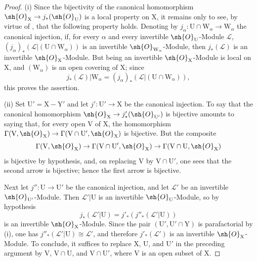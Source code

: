 \begin{proof}
(i) Since the bijectivity of the canonical homomorphism $\sh{O}_{\mathrm{X}}\to j_*(\sh{O}_{\mathrm{U}})$ is a local property on $\mathrm{X}$, it remains only to see, by virtue of , that the following property holds. Denoting by $j_\alpha:\mathrm{U}\cap\mathrm{W}_\alpha\to\mathrm{W}_\alpha$ the canonical injection, if, for every $\alpha$ and every invertible $\sh{O}_{\mathrm{U}}$-Module $\mathscr{L}$, $(j_\alpha)_*(\mathscr{L}|(\mathrm{U}\cap\mathrm{W}_\alpha))$ is an invertible $\sh{O}_{\mathrm{W}_\alpha}$-Module, then $j_*(\mathscr{L})$ is an invertible $\sh{O}_{\mathrm{X}}$-Module.
But being an invertible $\sh{O}_{\mathrm{X}}$-Module is local on $\mathrm{X}$, and $(\mathrm{W}_\alpha)$ is an open covering of $\mathrm{X}$; since
\[
  j_*(\mathscr{L})|\mathrm{W}_\alpha=(j_\alpha)_*(\mathscr{L}|(\mathrm{U}\cap\mathrm{W}_\alpha)),
\]
this proves the assertion.

(ii) Set $\mathrm{U}'=\mathrm{X}-\mathrm{Y}'$ and let $j':\mathrm{U}'\to\mathrm{X}$ be the canonical injection.
To say that the canonical homomorphism $\sh{O}_{\mathrm{X}}\to j'_*(\sh{O}_{\mathrm{U}'})$ is bijective amounts to saying that, for every open $\mathrm{V}$ of $\mathrm{X}$, the homomorphism $\Gamma(\mathrm{V},\sh{O}_{\mathrm{X}})\to\Gamma(\mathrm{V}\cap\mathrm{U}',\sh{O}_{\mathrm{X}})$ is bijective. But the composite
\[
  \Gamma(\mathrm{V},\sh{O}_{\mathrm{X}})\to\Gamma(\mathrm{V}\cap\mathrm{U}',\sh{O}_{\mathrm{X}})\to\Gamma(\mathrm{V}\cap\mathrm{U},\sh{O}_{\mathrm{X}})
\]
is bijective by hypothesis, and, on replacing $\mathrm{V}$ by $\mathrm{V}\cap\mathrm{U}'$, one sees that the second arrow is bijective; hence the first arrow is bijective.

Next let $j'':\mathrm{U}\to\mathrm{U}'$ be the canonical injection, and let $\mathscr{L}'$ be an invertible $\sh{O}_{\mathrm{U}'}$-Module. Then $\mathscr{L}'|\mathrm{U}$ is an invertible $\sh{O}_{\mathrm{U}}$-Module, so by hypothesis
\[
  j_*(\mathscr{L}'|\mathrm{U})=j'_*(j''_*(\mathscr{L}'|\mathrm{U}))
\]
is an invertible $\sh{O}_{\mathrm{X}}$-Module. Since the pair $(\mathrm{U}',\mathrm{U}'\cap\mathrm{Y})$ is parafactorial by (i), one has $j''_*(\mathscr{L}'|\mathrm{U})\cong\mathscr{L}'$, and therefore $j'_*(\mathscr{L}')$ is an invertible $\sh{O}_{\mathrm{X}}$-Module. To conclude, it suffices to replace $\mathrm{X}$, $\mathrm{U}$, and $\mathrm{U}'$ in the preceding argument by $\mathrm{V}$, $\mathrm{V}\cap\mathrm{U}$, and $\mathrm{V}\cap\mathrm{U}'$, where $\mathrm{V}$ is an open subset of $\mathrm{X}$.


\end{proof}

